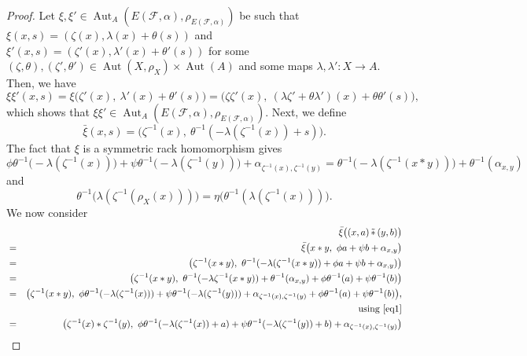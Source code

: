 \documentclass[11pt,reqno]{amsart}
\theoremstyle{definition}
\numberwithin{equation}{subsection}
\begin{document}
\begin{proof}
	Let $\xi,\xi' \in \operatorname{Aut}_{A}(E(\mathcal{F}, \alpha),\rho_{E(\mathcal{F}, \alpha)})$ be such that $\xi(x, s)=(\zeta(x), \lambda(x) +\theta(s))$ and $\xi'(x, s)=(\zeta'(x), \lambda'(x) +\theta'(s))$ for some $(\zeta, \theta), (\zeta', \theta')  \in      \operatorname{Aut}(X, \rho_{X}) \times \operatorname{Aut}(A)$ and some maps $\lambda, \lambda': X \longrightarrow A$. Then, we have
\begin{equation}\label{product auto formula}
\xi \xi'(x,s) = \xi \big(\zeta'(x), ~\lambda'(x) + \theta'(s)\big) = \big(\zeta\zeta'(x),~ (\lambda\zeta' + \theta\lambda')(x) + \theta\theta'(s)\big),
\end{equation}
which shows that $\xi\xi' \in \operatorname{Aut}_{A}(E(\mathcal{F}, \alpha),\rho_{E(\mathcal{F}, \alpha)})$. Next, we define 
$$\bar{\xi}(x,s)=\big(\zeta^{-1}(x), ~\theta^{-1}(-\lambda(\zeta^{-1}(x))+s) \big).$$  The fact that $\xi$ is a symmetric rack homomorphism gives
	\begin{equation}
		\phi \theta^{-1} \big(-\lambda(\zeta^{-1}(x))\big)+\psi\theta^{-1}\big(-\lambda(\zeta^{-1}(y))\big)+\alpha_{\zeta^{-1}(x),\zeta^{-1}(y)}=\theta^{-1} \big(-\lambda(\zeta^{-1}(x*y))\big)+\theta^{-1}(\alpha_{x,y})\label{eq1} 
	\end{equation} 
and
	\begin{equation}
		\theta^{-1} \big(\lambda(\zeta^{-1}(\rho_X(x)))\big) = \eta\big(\theta^{-1}(\lambda(\zeta^{-1}(x)))\big).
		\label{eq2}	
	\end{equation}
We now consider
	\begin{eqnarray*}
&& \bar{\xi} \big((x,a)\, \tilde{*} \,(y,b) \big)\\
		&=& \bar{\xi} \big(x*y, ~\phi a + \psi b + \alpha_{x,y} \big) \\
		&=& \big(\zeta^{-1}(x*y), ~\theta^{-1}(-\lambda(\zeta^{-1}(x*y)) + \phi a + \psi b + \alpha_{x,y}) \big) \\
		&=& \big(\zeta^{-1}(x*y), ~\theta^{-1}(-\lambda \zeta^{-1}(x*y)) + \theta^{-1}(\alpha_{x,y}) + \phi \theta^{-1}(a) + \psi \theta^{-1}(b) \big) \\
		&=& \big(\zeta^{-1}(x*y), ~\phi \theta^{-1}(-\lambda(\zeta^{-1}(x))) + \psi \theta^{-1}(-\lambda(\zeta^{-1}(y))) + \alpha_{\zeta^{-1}(x), \zeta^{-1}(y)}+ \phi \theta^{-1}(a) + \psi \theta^{-1}(b) \big),\\
		&& ~\text{using \eqref{eq1}} \\
		&=& \big(\zeta^{-1}(x)*\zeta^{-1}(y), ~\phi \theta^{-1}(-\lambda({\zeta^{-1}(x)}) + a) + \psi \theta^{-1}(-\lambda({\zeta^{-1}(y)}) + b) + \alpha_{\zeta^{-1}(x), \zeta^{-1}(y)}\big) \\

\end{eqnarray*}
\end{proof}
\end{document}
